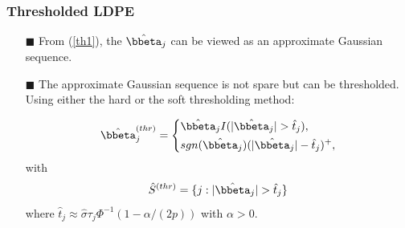\begin{frame}
\frametitle{Thresholded LDPE}
\begin{itemize}
\item[$\blacksquare$] From (\ref{th1}), the $\hat{\bbeta}_{j}$ can be viewed as an approximate Gaussian sequence.
\item[$\blacksquare$] The approximate Gaussian sequence is not spare but can be thresholded. Using either the hard or the soft thresholding method:

\begin{equation} \label{TLDPE}
\hat{\bbeta}^{(thr)}_{j}=
\left\{
        \begin{aligned}%
        & \hat{\bbeta}_{j} I(|\hat{\bbeta}_{j}|>\hat{t}_{j}),   \\
        & sgn(\hat{\bbeta}_{j})(|\hat{\bbeta}_{j}|-\hat{t}_{j})^{+}, \\
        \end{aligned}
\right.
\end{equation}
with
\begin{equation*}
\hat{S}^{(thr)}=\{j:|\hat{\bbeta}_{j}|>\hat{t}_{j}\}
\end{equation*}
where $\hat{t}_j \approx \hat{\sigma}\tau_j\Phi^{-1}(1-\alpha/(2p))$ with $\alpha>0$.
\end{itemize}

\end{frame}


